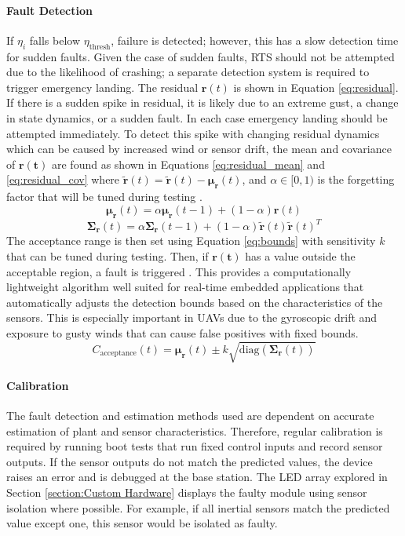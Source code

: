 \paragraph{Fault Detection}
If $\eta_i$ falls below $\eta_{\text{thresh}}$, failure is detected; however, this has a slow detection time for sudden faults. Given the case of sudden faults, \gls{RTS} should not be attempted due to the likelihood of crashing; a separate detection system is required to trigger emergency landing. The residual $\mathbf{r}(t)$ is shown in Equation \ref{eq:residual}. If there is a sudden spike in residual, it is likely due to an extreme gust, a change in state dynamics, or a sudden fault. In each case emergency landing should be attempted immediately. To detect this spike with changing residual dynamics which can be caused by increased wind or sensor drift, the mean and covariance of $\mathbf{r(t)}$ are found as shown in Equations \ref{eq:residual_mean} and \ref{eq:residual_cov} where  $\mathbf{\tilde{r}}(t) = \boldsymbol{\tilde{r}}(t) - \boldsymbol{\mu_r}(t)$, and $\alpha \in [0,1)$ is the forgetting factor that will be tuned during testing \cite{roberts1959}.
\begin{equation}\label{eq:residual_mean}
     \boldsymbol{\mu_r}(t) = \alpha \boldsymbol{\mu_r}(t-1) + (1 - \alpha) \mathbf{r}(t)
\end{equation}
\begin{equation}\label{eq:residual_cov}
    \boldsymbol{\Sigma_r}(t) = \alpha \boldsymbol{\Sigma_r}(t-1) + (1 - \alpha) \boldsymbol{\tilde{r}}(t)\boldsymbol{\tilde{r}}(t)^T
\end{equation}
The acceptance range is then set using Equation \ref{eq:bounds} with sensitivity $k$ that can be tuned during testing. Then, if $\mathbf{r(t)}$ has a value outside the acceptable region, a fault is triggered \cite{Perry2010}. This provides a computationally lightweight algorithm well suited for real-time embedded applications that automatically adjusts the detection bounds based on the characteristics of the sensors. This is especially important in \gls{UAV}s due to the gyroscopic drift and exposure to gusty winds that can cause false positives with fixed bounds.
\begin{equation}\label{eq:bounds}
    C_{\text{acceptance}}(t) = \boldsymbol{\mu_r}(t) \pm k \sqrt{\text{diag}(\boldsymbol{\Sigma_r}(t))}
\end{equation}

\paragraph{Calibration}
The fault detection and estimation methods used are
dependent on accurate estimation of plant and sensor characteristics. Therefore, regular calibration is required by running boot tests that run fixed control inputs and record sensor outputs. If the sensor outputs do not match the predicted values, the device raises an error and is debugged at the base station. The \gls{LED} array explored in Section \ref{section:Custom Hardware} displays the faulty module using sensor isolation where possible. For example, if all inertial sensors match the predicted value except one, this sensor would be isolated as faulty.

